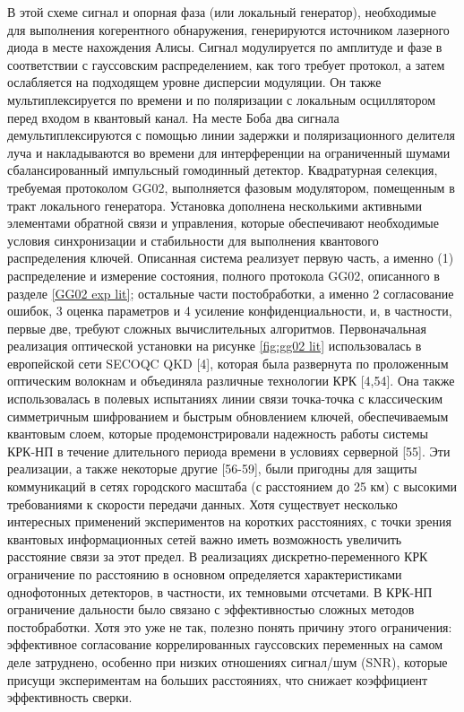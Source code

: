 В этой схеме сигнал и опорная фаза (или локальный генератор), необходимые для выполнения когерентного обнаружения, генерируются источником лазерного диода в месте нахождения Алисы. Сигнал модулируется по амплитуде и фазе в соответствии с гауссовским распределением, как того требует протокол, а затем ослабляется на подходящем уровне дисперсии модуляции. Он также мультиплексируется по времени и по поляризации с локальным осциллятором перед входом в квантовый канал. На месте Боба два сигнала демультиплексируются с помощью линии задержки и поляризационного делителя луча и накладываются во времени для интерференции на ограниченный шумами сбалансированный импульсный гомодинный детектор. Квадратурная селекция, требуемая протоколом GG02, выполняется фазовым модулятором, помещенным в тракт локального генератора. Установка дополнена несколькими активными элементами обратной связи и управления, которые обеспечивают необходимые условия синхронизации и стабильности для выполнения квантового распределения ключей. 
Описанная система реализует первую часть, а именно (1) распределение и измерение состояния, полного протокола GG02, описанного в разделе \ref{GG02 exp lit}; остальные части постобработки, а именно 2 согласование ошибок, 3 оценка параметров и 4 усиление конфиденциальности, и, в частности, первые две, требуют сложных вычислительных алгоритмов. Первоначальная реализация оптической установки на рисунке \ref{fig:gg02 lit} использовалась в европейской сети SECOQC QKD [4], которая была развернута по проложенным оптическим волокнам и объединяла различные технологии КРК [4,54]. Она также использовалась в полевых испытаниях линии связи точка-точка с классическим симметричным шифрованием и быстрым обновлением ключей, обеспечиваемым квантовым слоем, которые продемонстрировали надежность работы системы КРК-НП в течение длительного периода времени в условиях серверной [55]. Эти реализации, а также некоторые другие [56-59], были пригодны для защиты коммуникаций в сетях городского масштаба (с расстоянием до 25 км) с высокими требованиями к скорости передачи данных. Хотя существует несколько интересных применений экспериментов на коротких расстояниях, с точки зрения квантовых информационных сетей важно иметь возможность увеличить расстояние связи за этот предел. В реализациях дискретно-переменного КРК ограничение по расстоянию в основном определяется характеристиками однофотонных детекторов, в частности, их темновыми отсчетами. В КРК-НП ограничение дальности было связано с эффективностью сложных методов постобработки. Хотя это уже не так, полезно понять причину этого ограничения: эффективное согласование коррелированных гауссовских переменных на самом деле затруднено, особенно при низких отношениях сигнал/шум (SNR), которые присущи экспериментам на больших расстояниях, что снижает коэффициент эффективность сверки. 
